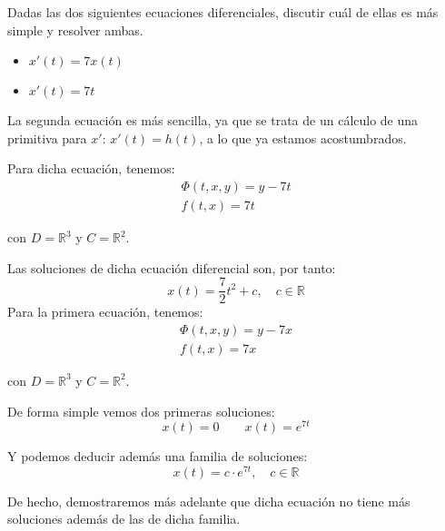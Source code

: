 \begin{ejemplo}
    Dadas las dos siguientes ecuaciones diferenciales, discutir cuál de ellas es más simple y resolver ambas.
    \begin{itemize}
        \item $x'(t) = 7x(t)$
        \item $x'(t) = 7t$
    \end{itemize}
    La segunda ecuación es más sencilla, ya que se trata de un cálculo de una primitiva para $x'$: $x'(t) = h(t)$, a lo que ya estamos acostumbrados.

    Para dicha ecuación, tenemos:
    \begin{gather*}
        \Phi(t,x,y) = y-7t \\
        f(t,x) = 7t
    \end{gather*}

    con $D=\mathbb{R}^3$ y $C=\mathbb{R}^2$.

    Las soluciones de dicha ecuación diferencial son, por tanto:
    \begin{equation*}
        x(t) = \frac{7}{2} t^2 + c, \quad c\in \mathbb{R}
    \end{equation*}
    Para la primera ecuación, tenemos:
    \begin{gather*}
        \Phi(t,x,y) = y-7x \\
        f(t,x) = 7x
    \end{gather*}

    con $D=\mathbb{R}^3$ y $C=\mathbb{R}^2$.

    De forma simple vemos dos primeras soluciones:
    \begin{equation*}
        x(t) = 0 \qquad  x(t) = e^{7t}
    \end{equation*}

    Y podemos deducir además una familia de soluciones:
    \begin{equation*}
        x(t) = c \cdot e^{7t}, \quad c\in \mathbb{R}
    \end{equation*}

    De hecho, demostraremos más adelante que dicha ecuación no tiene más soluciones además de las de dicha familia.

\end{ejemplo}

